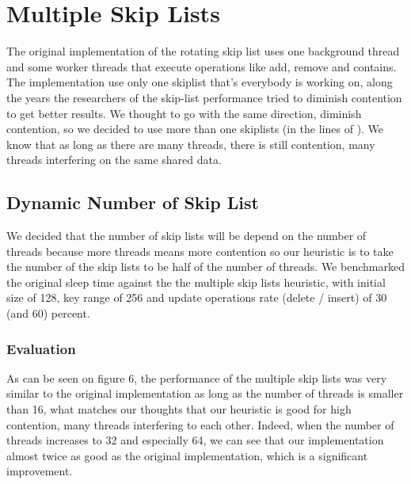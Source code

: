 \documentclass{article}
\begin{document}
\section{Multiple Skip Lists}
\label{sec:msl}

The original implementation of the rotating skip list uses one background thread and some worker threads that execute operations like add, remove and contains.
The implementation use only one skiplist that's everybody is working on, along the years the researchers of the skip-list performance tried to diminish contention to get better results.
We thought to go with the same direction, diminish contention, so we decided to use more than one skiplists (in the lines of \cite{C5}). We know that as long as there are many threads, there is still contention, many threads interfering on the same shared data. 


\subsection{Dynamic Number of Skip List}
\label{ssec:dsrs}

We decided that the number of skip lists will be depend on the number of threads because more threads means more contention so our heuristic is to take the number of the skip lists to be half of the number of threads.
We benchmarked the original sleep time against the the multiple skip lists heuristic, with initial size of 128, key range of 256 and update operations rate (delete / insert) of 30 (and 60) percent. 

\subsubsection{Evaluation}
\label{sssec:dsrs-evl}

As can be seen on figure 6, the performance of the multiple skip lists was very similar to the original implementation as long as the number of threads is smaller than 16, what matches our thoughts that our heuristic is good for high contention, many threads interfering to each other. Indeed, when the number of threads increases to 32 and especially 64, we can see that our implementation almost twice as good as the original implementation, which is a significant improvement.
\end{document}
